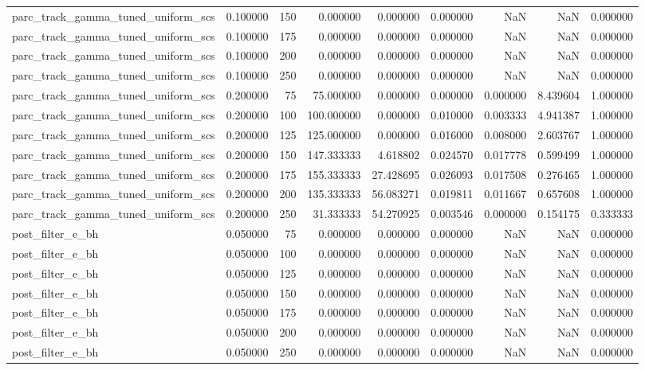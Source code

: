 \begin{tabular}{lrrrrrrrr}
parc_track_gamma_tuned_uniform_scs & 0.100000 & 150 & 0.000000 & 0.000000 & 0.000000 & NaN & NaN & 0.000000 \\
parc_track_gamma_tuned_uniform_scs & 0.100000 & 175 & 0.000000 & 0.000000 & 0.000000 & NaN & NaN & 0.000000 \\
parc_track_gamma_tuned_uniform_scs & 0.100000 & 200 & 0.000000 & 0.000000 & 0.000000 & NaN & NaN & 0.000000 \\
parc_track_gamma_tuned_uniform_scs & 0.100000 & 250 & 0.000000 & 0.000000 & 0.000000 & NaN & NaN & 0.000000 \\
parc_track_gamma_tuned_uniform_scs & 0.200000 & 75 & 75.000000 & 0.000000 & 0.000000 & 0.000000 & 8.439604 & 1.000000 \\
parc_track_gamma_tuned_uniform_scs & 0.200000 & 100 & 100.000000 & 0.000000 & 0.010000 & 0.003333 & 4.941387 & 1.000000 \\
parc_track_gamma_tuned_uniform_scs & 0.200000 & 125 & 125.000000 & 0.000000 & 0.016000 & 0.008000 & 2.603767 & 1.000000 \\
parc_track_gamma_tuned_uniform_scs & 0.200000 & 150 & 147.333333 & 4.618802 & 0.024570 & 0.017778 & 0.599499 & 1.000000 \\
parc_track_gamma_tuned_uniform_scs & 0.200000 & 175 & 155.333333 & 27.428695 & 0.026093 & 0.017508 & 0.276465 & 1.000000 \\
parc_track_gamma_tuned_uniform_scs & 0.200000 & 200 & 135.333333 & 56.083271 & 0.019811 & 0.011667 & 0.657608 & 1.000000 \\
parc_track_gamma_tuned_uniform_scs & 0.200000 & 250 & 31.333333 & 54.270925 & 0.003546 & 0.000000 & 0.154175 & 0.333333 \\
post_filter_e_bh & 0.050000 & 75 & 0.000000 & 0.000000 & 0.000000 & NaN & NaN & 0.000000 \\
post_filter_e_bh & 0.050000 & 100 & 0.000000 & 0.000000 & 0.000000 & NaN & NaN & 0.000000 \\
post_filter_e_bh & 0.050000 & 125 & 0.000000 & 0.000000 & 0.000000 & NaN & NaN & 0.000000 \\
post_filter_e_bh & 0.050000 & 150 & 0.000000 & 0.000000 & 0.000000 & NaN & NaN & 0.000000 \\
post_filter_e_bh & 0.050000 & 175 & 0.000000 & 0.000000 & 0.000000 & NaN & NaN & 0.000000 \\
post_filter_e_bh & 0.050000 & 200 & 0.000000 & 0.000000 & 0.000000 & NaN & NaN & 0.000000 \\
post_filter_e_bh & 0.050000 & 250 & 0.000000 & 0.000000 & 0.000000 & NaN & NaN & 0.000000 \\

\end{tabular}
